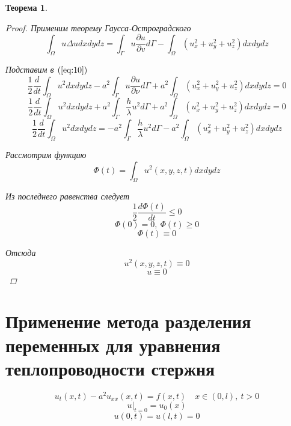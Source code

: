\documentclass[a4paper]{article}
\newtheorem*{theorem}{Теорема}
\theoremstyle{definition}
\theoremstyle{remark}
\begin{document}
\begin{tcolorbox}[enhanced,breakable,skin first=enhanced,skin middle=enhanced,skin last=enhanced]
\begin{theorem}
\begin{proof}
            Применим теорему Гаусса-Остроградского
            \begin{equation}
                \int_\Omega u \Delta u dxdydz = \int_{\Gamma} u \frac{\partial u}{\partial v} 
                d \Gamma - \int_{\Omega}(u_x^2 + u_y^2 + u_z^2) dxdydz
                \label{eq:11}
            \end{equation}

            Подставим в $ (\ref{eq:10}) $ 
            \begin{equation}
                \frac{1}{2} \frac{d}{dt} \int_{\Omega}u^2 dxdydz - a^2
                \int_{\Gamma}u \frac{\partial u}{\partial \nu} d \Gamma
                + a^2 \int_\Omega (u_{x}^2 + u_y^2 + u_z^2) dxdydz = 0
                \label{eq:12}
            \end{equation}
            \[
                \frac{1}{2} \frac{d}{dt} \int_{\Omega}u^2 dxdydz + a^2
                \int_{\Gamma} \frac{h}{\lambda} u^2 d \Gamma
                + a^2 \int_\Omega (u_{x}^2 + u_y^2 + u_z^2) dxdydz = 0
            \]
            \[
                \frac{1}{2} \frac{d}{dt} \int_{\Omega}u^2 dxdydz = - a^2
                \int_{\Gamma} \frac{h}{\lambda} u^2 d \Gamma
                - a^2 \int_\Omega (u_{x}^2 + u_y^2 + u_z^2) dxdydz
            \]

            Рассмотрим функцию
            \[
                \Phi(t) = \int_\Omega u^2(x,y,z,t) dxdydz
            \]

            Из последнего равенства следует
            \[
                \frac{1}{2} \frac{d\Phi(t)}{dt} \leq 0
            \]
            \[
                \Phi(0) = 0, \ \Phi(t) \geq 0
            \]
            \[
                \Phi(t) \equiv 0
            \]

            Отсюда
            \[
                u^2(x,y,z,t) \equiv 0
            \]
            \[
                u \equiv 0
            \]
        \end{proof}
    \end{theorem}
\end{tcolorbox}

\section*{Применение метода разделения переменных для уравнения теплопроводности
стержня}
\begin{equation}
    u_t(x,t) - a^2 u_{xx}(x,t) = f(x,t) \quad x \in (0,l), \ t > 0
\end{equation}
\begin{equation}
    u|_{t=0} = u_0(x)
\end{equation}
\begin{equation}
    u(0,t) = u(l,t) = 0
\end{equation}
\end{document}
